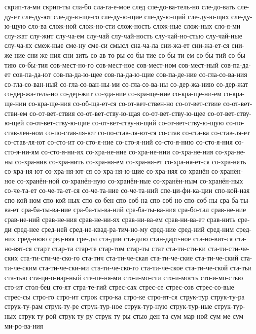 {скрип-та-ми
скрип-ты
сла-бо
сла-га-е-мое
след
сле-до-ва-тель-но
сле-до-вать
сле-ду-ет
сле-ду-ют
сле-ду-ю-ще-го
сле-ду-ю-щие
сле-ду-ю-щий
сле-ду-ю-щих
сле-ду-ю-щую
сло-ва
слож-ной
слож-но-сти
слож-ность
слож-ные
слож-ных
сло-я-ми
слу-жат
слу-жит
слу-ча-ем
слу-чай
слу-чай-ность
слу-чай-но-стью
слу-чай-ные
слу-ча-ях
смеж-ные
сме-ну
сме-си
смысл
сна-ча-ла
сни-жа-ет
сни-жа-ет-ся
сни-же-ние
сни-же-ния
сни-зить
со-ав-то-ры
со-бы-тие
со-бы-ти-ем
со-бы-тий
со-бы-тию
со-бы-тия
сов-мест-но-го
сов-мест-ное
сов-мест-ном
сов-мест-ный
сов-па-да-ет
сов-па-да-ют
сов-па-да-ю-щее
сов-па-да-ю-щие
сов-па-де-ние
со-гла-со-ва-ния
со-гла-со-ван-ный
со-гла-со-ван-ны-ми
со-гла-со-ва-ны
со-дер-жа-нию
со-дер-жат
со-дер-жа-тель-но
со-дер-жит
со-зда-ние
со-кра-ще-ние
со-кра-ще-ни-ем
со-кра-ще-нии
со-кра-ще-ния
со-об-ща-ет-ся
со-от-вет-ствен-но
со-от-вет-ствие
со-от-вет-стви-ем
со-от-вет-ствия
со-от-вет-ству-ю-щая
со-от-вет-ству-ю-щее
со-от-вет-ству-ю-щей
со-от-вет-ству-ю-щие
со-от-вет-ству-ю-щий
со-от-вет-ству-ю-щую
со-по-став-лен-ном
со-по-став-ля-ют
со-по-став-ля-ют-ся
со-став
со-ста-ва
со-став-ля-ет
со-став-ля-ют
со-сто-ит
со-сто-я-ние
со-сто-я-ний
со-сто-я-нию
со-сто-я-ния
со-сто-я-ни-ям
со-сто-я-ни-ях
со-хра-не-ние
со-хра-не-нии
со-хра-не-ния
со-хра-не-ны
со-хра-нив
со-хра-нить
со-хра-ня-ем
со-хра-ня-ет
со-хра-ня-ет-ся
со-хра-нять
со-хра-ня-ют
со-хра-ня-ют-ся
со-хра-ня-ю-щие
со-хра-няя
со-хранён
со-хранён-ное
со-хранён-ной
со-хранён-ную
со-хранён-ные
со-хранён-ным
со-хранён-ных
со-че-та-ет
со-че-та-ет-ся
со-че-та-ние
со-че-та-ний
спе-ци-фи-ка-ции
спо-кой-ная
спо-кой-ном
спо-кой-ных
спо-со-бен
спо-соб-на
спо-соб-но
спо-соб-ны
сра-ба-ты-ва-ет
сра-ба-ты-ва-ние
сра-ба-ты-ва-ний
сра-ба-ты-ва-ния
сра-бо-тал
срав-не-ние
срав-не-ний
срав-не-ния
срав-не-ни-ях
срав-ни-ва-ем
срав-ни-ва-ет
срав-нить
сре-ди
сред-нее
сред-ней
сред-не-квад-ра-тич-но-му
сред-ние
сред-ний
сред-ним
сред-них
сред-нюю
сред-няя
сре-ды
ста-дии
ста-дию
стан-дарт-ное
ста-но-вит-ся
ста-но-вят-ся
старт
стар-та
стар-те
стар-том
стар-ты
стат
ста-ти-сти-ки
ста-ти-сти-че-ских
ста-ти-сти-че-ско-го
ста-тич
ста-ти-че-ская
ста-ти-че-ские
ста-ти-че-ский
ста-ти-че-ским
ста-ти-че-ски-ми
ста-ти-че-ско-го
ста-ти-че-ское
ста-ти-че-ской
ста-тьи
ста-тью
ста-ци-о-нар-ный
сте-пе-ня-ми
сто-и-мо-сти
сто-и-мость
сто-и-мо-стью
сто-ит
стол-бец
сто-ят
стра-те-гий
стрес-сах
стрес-се
стрес-сов
стрес-со-вые
стрес-сы
стро-го
стро-ит
строк
стро-ка
стро-ке
стро-ят-ся
струк-тур
струк-ту-ра
струк-ту-рам
струк-ту-ре
струк-тур-ное
струк-тур-ную
струк-тур-ные
струк-тур-ных
струк-ту-рой
струк-ту-ру
струк-ту-ры
стью-ден-та
сум-мар-ной
сум-ме
сум-ми-ро-ва-ния
}
